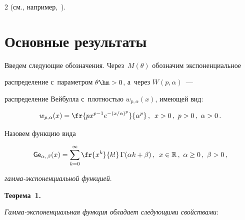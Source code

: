 \begin{multicols}{2}
(см., например,~\cite{Artin, BeEr,AbSt}).





\section{Основные результаты}








Введем следующие обозначения. Через~$M(\theta)$ обозначим экспоненциальное 


распределение с~параметром $\theta\hm>0$, а~через $W(p,\alpha)$~--- 


распределение Вейбулла с~плот\-ностью $w_{p,\alpha}(x)$, имеющей вид:


$$


w_{p,\alpha}(x) = \fr{px^{p-1}e^{-({x/\alpha})^p}}{\alpha^{p}} \,, \enskip


 x>0\,,\  p>0\,,\ \alpha>0\,.


 $$


Назовем функцию вида


$$


\G_{\alpha,\, \beta} (x) = \sum\limits_{k=0}^{\infty}


\fr{x^k}{k!}\, \Gamma(\alpha k + \beta)\,, \enskip


 x\in\mathbb{R}\,, \ \alpha\ge0\,, \  \beta> 0\,,


 $$


\textit{гамма-экспо\-нен\-ци\-аль\-ной функцией}.








\smallskip





\noindent


\textbf{Теорема~1.}\


\textit{Гамма-экспо\-нен\-ци\-аль\-ная функция обладает следующими свойствами}:


\end{multicols}
